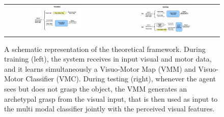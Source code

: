 \begin{figure}[tb] 
\centering
  \begin{tabular}{cc}
    \includegraphics[width=0.48\textwidth]{images/train_fig_.pdf} &
    \includegraphics[width=0.48\textwidth]{images/test_fig_.pdf} \\
  \end{tabular}
  \caption{A schematic representation of the theoretical framework. During training (left), the system receives in input visual and
motor data, and it learns simultaneously a Visuo-Motor Map (VMM) and  Visuo-Motor Classifier (VMC). During testing (right), whenever
the agent sees but does not grasp the object, the VMM generates an archetypal grasp from the visual input, that is then used as
input to the multi modal classifier jointly with the perceived visual features.}
  \label{fig:framework}
\end{figure}


%



